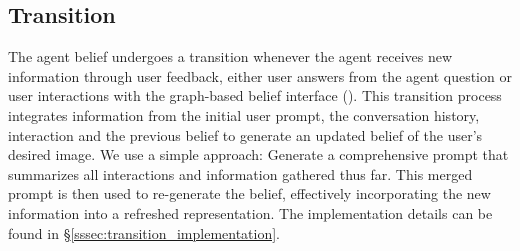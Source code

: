 \subsection{Transition} \label{ssec:transition}
\vspace{-.5em}
The agent belief undergoes a transition whenever the agent receives new information through user feedback, either user answers from the agent question or user interactions with the graph-based belief interface (). This transition process integrates information from the initial user prompt, the conversation history, interaction and the previous belief to generate an updated belief of the user's desired image.  We use a simple approach: Generate a comprehensive prompt that summarizes all interactions and information gathered thus far. This merged prompt is then used to re-generate the belief, effectively incorporating the new information into a refreshed representation. The implementation details can be found in \S\ref{sssec:transition_implementation}.%











































